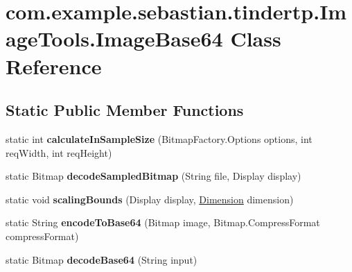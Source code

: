 \hypertarget{classcom_1_1example_1_1sebastian_1_1tindertp_1_1ImageTools_1_1ImageBase64}{}\section{com.\+example.\+sebastian.\+tindertp.\+Image\+Tools.\+Image\+Base64 Class Reference}
\label{classcom_1_1example_1_1sebastian_1_1tindertp_1_1ImageTools_1_1ImageBase64}
\subsection*{Static Public Member Functions}
\begin{DoxyCompactItemize}
\item 
static int {\bfseries calculate\+In\+Sample\+Size} (Bitmap\+Factory.\+Options options, int req\+Width, int req\+Height)\hypertarget{classcom_1_1example_1_1sebastian_1_1tindertp_1_1ImageTools_1_1ImageBase64_af285e950500c909a3b064558cd2e1dbd}{}\label{classcom_1_1example_1_1sebastian_1_1tindertp_1_1ImageTools_1_1ImageBase64_af285e950500c909a3b064558cd2e1dbd}

\item 
static Bitmap {\bfseries decode\+Sampled\+Bitmap} (String file, Display display)\hypertarget{classcom_1_1example_1_1sebastian_1_1tindertp_1_1ImageTools_1_1ImageBase64_aa4a49e4b1976c8e24ca2fba36c0ba4de}{}\label{classcom_1_1example_1_1sebastian_1_1tindertp_1_1ImageTools_1_1ImageBase64_aa4a49e4b1976c8e24ca2fba36c0ba4de}

\item 
static void {\bfseries scaling\+Bounds} (Display display, \hyperlink{classcom_1_1example_1_1sebastian_1_1tindertp_1_1commonTools_1_1Dimension}{Dimension} dimension)\hypertarget{classcom_1_1example_1_1sebastian_1_1tindertp_1_1ImageTools_1_1ImageBase64_aed9d5cf82f58a328a359131e1797952e}{}\label{classcom_1_1example_1_1sebastian_1_1tindertp_1_1ImageTools_1_1ImageBase64_aed9d5cf82f58a328a359131e1797952e}

\item 
static String {\bfseries encode\+To\+Base64} (Bitmap image, Bitmap.\+Compress\+Format compress\+Format)\hypertarget{classcom_1_1example_1_1sebastian_1_1tindertp_1_1ImageTools_1_1ImageBase64_a23bf5724833607045829525fb82a1c85}{}\label{classcom_1_1example_1_1sebastian_1_1tindertp_1_1ImageTools_1_1ImageBase64_a23bf5724833607045829525fb82a1c85}

\item 
static Bitmap {\bfseries decode\+Base64} (String input)\hypertarget{classcom_1_1example_1_1sebastian_1_1tindertp_1_1ImageTools_1_1ImageBase64_a1c57a6e5a8ba9401e5d4782f27e155d8}{}\label{classcom_1_1example_1_1sebastian_1_1tindertp_1_1ImageTools_1_1ImageBase64_a1c57a6e5a8ba9401e5d4782f27e155d8}

\end{DoxyCompactItemize}
